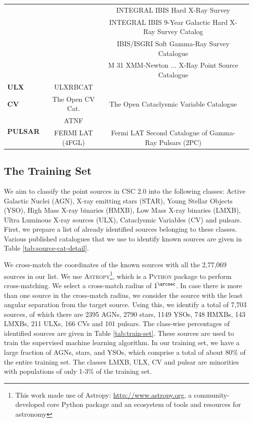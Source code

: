 \documentclass[fleqn,usenatbib]{mnras}
\begin{document}
\begin{table}
\begin{tabular}{@{}lccr@{}}
         &  & INTEGRAL IBIS Hard X-Ray Survey & \cite{lmxb-integral-2015} \\
         &  & INTEGRAL IBIS 9-Year Galactic Hard X-Ray Survey Catalog& \cite{lmxb-integral-2012} \\
         &  & IBIS/ISGRI Soft Gamma-Ray Survey Catalogue & \cite{hmxb-bird-2016} \\
         &  & M 31 XMM-Newton ... X-Ray Point Source Catalogue & \cite{lmxb-xmm-2009} \\
          \textbf{ULX} & ULXRBCAT & & \cite{ulx-liu-2005}\\
         \textbf{CV} & The Open CV Cat. & The Open Cataclysmic Variable Catalogue  & \cite{2020RNAAS...4..219J} \\
        \multirow{2}{*}{\textbf{PULSAR}} & ATNF &  & \cite{2005AJ....129.1993M} \\
         & FERMI LAT (4FGL) & Fermi LAT Second Catalogue of Gamma-Ray Pulsars (2PC) & \cite{fermi-lat2013ApJS..208...17A} \\
         \bottomrule
        \end{tabular}%
    \end{table}
    
 \subsection{The Training Set}
    We aim to classify the point sources in CSC 2.0 into the following classes: Active Galactic Nuclei (AGN), X-ray emitting stars (STAR), Young Stellar Objects (YSO), High Mass X-ray binaries (HMXB), Low Mass X-ray binaries (LMXB), Ultra Luminous X-ray sources (ULX), Cataclysmic Variables (CV) and pulsars. First, we prepare a list of already identified sources belonging to these classes. Various published catalogues that we use to identify known sources are given in Table \ref{tab:source-cat-detail}.
    
   We cross-match the coordinates of the known sources with all the 2,77,069 sources in our list. We use \textsc{Astropy}\footnote{This work made use of Astropy: \url{http://www.astropy.org}, a community-developed core Python package and an ecosystem of tools and resources for astronomy}, which is a \textsc{Python} package to perform cross-matching. We select a cross-match radius of $1^{\arcsec}$. In case there is more than one source in the cross-match radius, we consider the source with the least angular separation from the target source. Using this, we identify a total of 7,703 sources, of which there are 2395 AGNs, 2790 stars, 1149 YSOs, 748 HMXBs, 143 LMXBs, 211 ULXs, 166 CVs and 101 pulsars. The class-wise percentages of identified sources are given in Table \ref{tab:train-set}. These sources are used to train the supervised machine learning algorithm.
   In our training set, we have a large fraction of AGNs, stars, and YSOs, which comprise a total of about 80\% of the entire training set. The classes LMXB, ULX, CV and pulsar are minorities with populations of only 1-3\% of the training set. 
     
\end{document}
